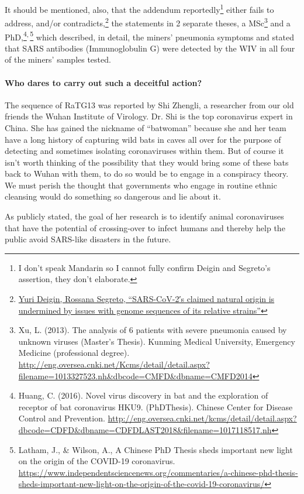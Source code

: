\documentclass[11pt]{article}
\begin{document}
It should be mentioned, also, that the addendum reportedly\footnote{I don't speak Mandarin so I cannot fully confirm Deigin and Segreto's assertion, they don't elaborate.} either fails to address, and/or contradicts,\footnote{\href{https://onlinelibrary.wiley.com/doi/pdfdirect/10.1002/bies.202100015}{Yuri Deigin, Rossana Segreto, ``SARS-CoV-2′s claimed natural origin is undermined by issues with genome sequences of its relative strains''}} the statements in 2 separate theses, a MSc\footnote{Xu, L. (2013). The analysis of 6 patients with severe pneumonia caused by unknown viruses (Master’s Thesis). Kunming Medical University, Emergency Medicine (professional degree). \url{http://eng.oversea.cnki.net/Kcms/detail/detail.aspx?filename=1013327523.nh\&dbcode=CMFD\&dbname=CMFD2014}} and a PhD,\footnote{Huang, C. (2016). Novel virus discovery in bat and the exploration of receptor of bat coronavirus HKU9. (PhDThesis). Chinese Center for Disease Control and Prevention. \url{http://eng.oversea.cnki.net/kcms/detail/detail.aspx?dbcode=CDFD\&dbname=CDFDLAST2018\&filename=1017118517.nh}}\textsuperscript{,}\,\footnote{Latham, J., \& Wilson, A., A Chinese PhD Thesis sheds important new light on the origin of the COVID-19 coronavirus. \url{https://www.independentsciencenews.org/commentaries/a-chinese-phd-thesis-sheds-important-new-light-on-the-origin-of-the-covid-19-coronavirus/}} which described, in detail, the miners' pneumonia symptoms and stated that SARS antibodies (Immunoglobulin G) were detected by the WIV in all four of the miners' samples tested.

\paragraph{Who dares to carry out such a deceitful action?}
\label{sec:org271724d}
The sequence of RaTG13 was reported by Shi Zhengli, a researcher from our old friends the Wuhan Institute of Virology. Dr. Shi is the top coronavirus expert in China. She has gained the nickname of “batwoman” because she and her team have a long history of capturing wild bats in caves all over for the purpose of detecting and sometimes isolating coronaviruses within them. But of course it isn't worth thinking of the possibility that they would bring some of these bats back to Wuhan with them, to do so would be to engage in a conspiracy theory. We must perish the thought that governments who engage in routine ethnic cleansing would do something so dangerous and lie about it.

As publicly stated, the goal of her research is to identify animal coronaviruses that have the potential of crossing-over to infect humans and thereby help the public avoid SARS-like disasters in the future.
\end{document}
